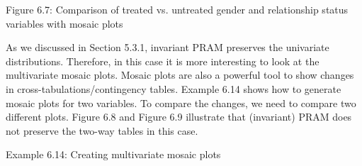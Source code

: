 \documentclass[letterpaper,10pt,english]{sphinxmanual}
\begin{document}
\noindent{}

Figure 6.7: Comparison of treated vs. untreated gender and relationship
status variables with mosaic plots

As we discussed in Section 5.3.1, invariant PRAM preserves the
univariate distributions. Therefore, in this case it is more interesting
to look at the multivariate mosaic plots. Mosaic plots are also a
powerful tool to show changes in cross-tabulations/contingency tables.
Example 6.14 shows how to generate mosaic plots for two variables. To
compare the changes, we need to compare two different plots. Figure 6.8
and Figure 6.9 illustrate that (invariant) PRAM does not preserve the
two-way tables in this case.

Example 6.14: Creating multivariate mosaic plots
\end{document}
